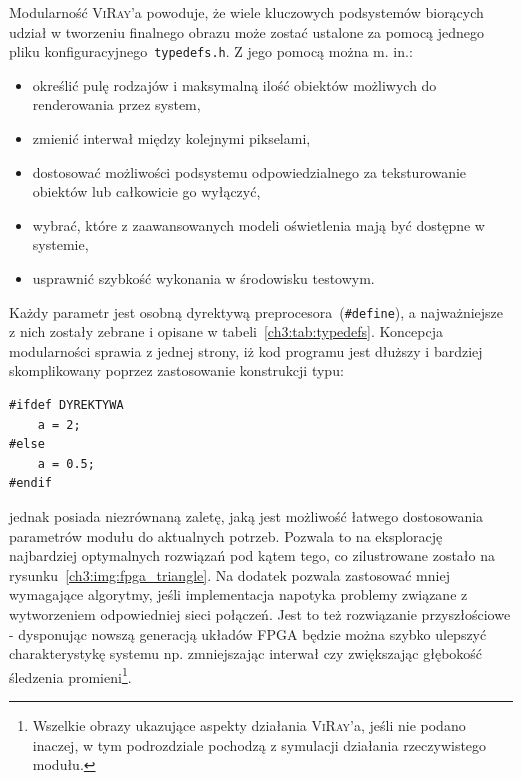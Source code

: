 Modularność \textsc{ViRay}'a powoduje, że wiele kluczowych podsystemów biorących udział w tworzeniu finalnego obrazu może zostać ustalone za pomocą jednego pliku konfiguracyjnego~\texttt{typedefs.h}. Z jego pomocą można m. in.:
\begin{itemize}
\item określić pulę rodzajów i maksymalną ilość obiektów możliwych do renderowania przez system,
\item zmienić interwał między kolejnymi pikselami,
\item dostosować możliwości podsystemu odpowiedzialnego za teksturowanie obiektów lub całkowicie go wyłączyć,
\item wybrać, które z zaawansowanych modeli oświetlenia mają być dostępne w systemie,
\item usprawnić szybkość wykonania w środowisku testowym.
\end{itemize}
Każdy parametr jest osobną dyrektywą preprocesora~(\texttt{\#define}), a najważniejsze z nich zostały zebrane i opisane w tabeli~\ref{ch3:tab:typedefs}. Koncepcja modularności sprawia z jednej strony, iż kod programu jest dłuższy i bardziej skomplikowany poprzez zastosowanie konstrukcji typu:
\begin{lstlisting}
#ifdef DYREKTYWA
	a = 2;
#else
	a = 0.5;
#endif
\end{lstlisting}
jednak posiada niezrównaną zaletę, jaką jest możliwość łatwego dostosowania parametrów modułu do aktualnych potrzeb. Pozwala to na eksplorację najbardziej optymalnych rozwiązań pod kątem tego, co zilustrowane zostało na rysunku~\ref{ch3:img:fpga_triangle}. Na dodatek pozwala zastosować mniej wymagające algorytmy, jeśli implementacja napotyka problemy związane z wytworzeniem odpowiedniej sieci połączeń. Jest to też rozwiązanie przyszłościowe - dysponując nowszą generacją układów FPGA będzie można szybko ulepszyć charakterystykę systemu np. zmniejszając interwał czy zwiększając głębokość śledzenia promieni\footnote{Wszelkie obrazy ukazujące aspekty działania \textsc{ViRay}'a, jeśli nie podano inaczej, w tym podrozdziale pochodzą z symulacji działania rzeczywistego modułu.}.



